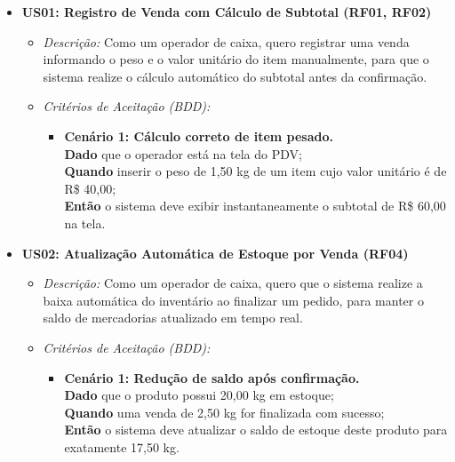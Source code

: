 \documentclass[
	12pt,				%
	openany,			%
	oneside,			%
	a4paper,			%
	english,			%
	french,				%
	spanish,			%
	brazil				%
	]{abntex2}
\begin{document}
\begin{itemize}
    \item \textbf{US01: Registro de Venda com Cálculo de Subtotal (RF01, RF02)}
    \begin{itemize}
        \item \textit{Descrição:} Como um operador de caixa, quero registrar uma venda informando o peso e o valor unitário do item manualmente, para que o sistema realize o cálculo automático do subtotal antes da confirmação.
        \item \textit{Critérios de Aceitação (BDD):}
        \begin{itemize}
            \item \textbf{Cenário 1: Cálculo correto de item pesado.} \\
            \textbf{Dado} que o operador está na tela do PDV; \\
            \textbf{Quando} inserir o peso de 1,50 kg de um item cujo valor unitário é de R\$ 40,00; \\
            \textbf{Então} o sistema deve exibir instantaneamente o subtotal de R\$ 60,00 na tela.
        \end{itemize}
    \end{itemize}

    \item \textbf{US02: Atualização Automática de Estoque por Venda (RF04)}
    \begin{itemize}
        \item \textit{Descrição:} Como um operador de caixa, quero que o sistema realize a baixa automática do inventário ao finalizar um pedido, para manter o saldo de mercadorias atualizado em tempo real.
        \item \textit{Critérios de Aceitação (BDD):}
        \begin{itemize}
            \item \textbf{Cenário 1: Redução de saldo após confirmação.} \\
            \textbf{Dado} que o produto possui 20,00 kg em estoque; \\
            \textbf{Quando} uma venda de 2,50 kg for finalizada com sucesso; \\
            \textbf{Então} o sistema deve atualizar o saldo de estoque deste produto para exatamente 17,50 kg.
        \end{itemize}
    \end{itemize}


\end{itemize}
\end{document}
